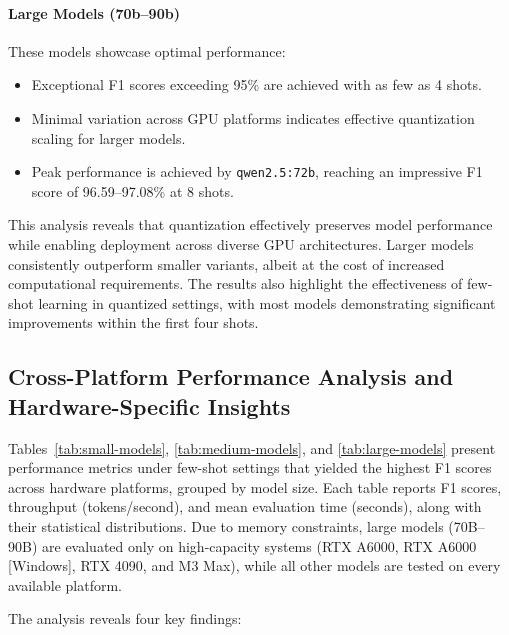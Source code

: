 \documentclass[conference]{IEEEtran}
\begin{document}
\paragraph{Large Models (70b--90b)} These models showcase optimal performance:
\begin{itemize}
    \item Exceptional F1 scores exceeding 95\% are achieved with as few as 4 shots.
    \item Minimal variation across GPU platforms indicates effective quantization scaling for larger models.
    \item Peak performance is achieved by \texttt{qwen2.5:72b}, reaching an impressive F1 score of 96.59--97.08\% at 8 shots.
\end{itemize}


This analysis reveals that quantization effectively preserves model performance while enabling deployment across diverse GPU architectures. Larger models consistently outperform smaller variants, albeit at the cost of increased computational requirements. The results also highlight the effectiveness of few-shot learning in quantized settings, with most models demonstrating significant improvements within the first four shots.

\subsection{Cross-Platform Performance Analysis and Hardware-Specific Insights}
\label{sec:cross-platform}

Tables~\ref{tab:small-models}, \ref{tab:medium-models}, and \ref{tab:large-models} present performance metrics under few-shot settings that yielded the highest F1 scores across hardware platforms, grouped by model size. Each table reports F1 scores, throughput (tokens/second), and mean evaluation time (seconds), along with their statistical distributions. Due to memory constraints, large models (70B--90B) are evaluated only on high-capacity systems (RTX A6000, RTX A6000 [Windows], RTX 4090, and M3 Max), while all other models are tested on every available platform.

The analysis reveals four key findings:
\end{document}
